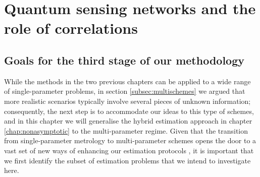 \chapter{Quantum sensing networks and the role of correlations}
\label{chap:networks}

\section{Goals for the third stage of our methodology}
\label{sec:goals6}

While the methods in the two previous chapters can be applied to a wide range of single-parameter problems, in section \ref{subsec:multischemes} we argued that more realistic scenarios typically involve several pieces of unknown information; consequently, the next step is to accommodate our ideas to this type of schemes, and in this chapter we will generalise the hybrid estimation approach in chapter \ref{chap:nonasymptotic} to the multi-parameter regime. Given that the transition from single-parameter metrology to multi-parameter schemes opens the door to a vast set of new ways of enhancing our estimation protocols \cite{chiara2003, spagnolo2012, chiribella2012, humphreys2013, zhang2014, berry2015, baumgratz2016, knott2016local, gagatos2016gaussian, Szczykulska2016, jasminder2016, proctor2017networked, proctor2017networkedshort, vidrighin2014, szczykulska2017, zhang_lu2017, altenburg2017, zhuang2017, altenburg2018, hall2018, sekatski2019, qian2019, polino2018, roccia2018, jasminder2018, ge2018, eldredge2018, li2019, gatto2019}, it is important that we first identify the subset of estimation problems that we intend to investigate here. 

